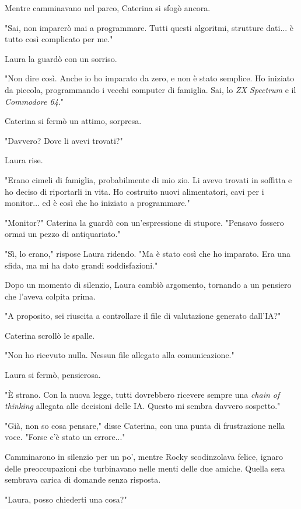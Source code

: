 Mentre camminavano nel parco, Caterina si sfogò ancora.

"Sai, non imparerò mai a programmare. Tutti questi algoritmi, strutture dati... è tutto così complicato per me."

Laura la guardò con un sorriso.

"Non dire così. Anche io ho imparato da zero, e non è stato semplice. Ho iniziato da piccola, programmando i vecchi computer di famiglia. Sai, lo \emph{ZX Spectrum} e il \emph{Commodore 64}."

Caterina si fermò un attimo, sorpresa.

"Davvero? Dove li avevi trovati?"

Laura rise.

"Erano cimeli di famiglia, probabilmente di mio zio. Li avevo trovati in soffitta e ho deciso di riportarli in vita. Ho costruito nuovi alimentatori, cavi per i monitor... ed è così che ho iniziato a programmare."

"Monitor?" Caterina la guardò con un'espressione di stupore. "Pensavo fossero ormai un pezzo di antiquariato."

"Sì, lo erano," rispose Laura ridendo. "Ma è stato così che ho imparato. Era una sfida, ma mi ha dato grandi soddisfazioni."

Dopo un momento di silenzio, Laura cambiò argomento, tornando a un pensiero che l'aveva colpita prima.

"A proposito, sei riuscita a controllare il file di valutazione generato dall'IA?"

Caterina scrollò le spalle.

"Non ho ricevuto nulla. Nessun file allegato alla comunicazione."

Laura si fermò, pensierosa.

"È strano. Con la nuova legge, tutti dovrebbero ricevere sempre una \emph{chain of thinking} allegata alle decisioni delle IA. Questo mi sembra davvero sospetto."

"Già, non so cosa pensare," disse Caterina, con una punta di frustrazione nella voce. "Forse c'è stato un errore..."

Camminarono in silenzio per un po', mentre Rocky scodinzolava felice, ignaro delle preoccupazioni che turbinavano nelle menti delle due amiche. Quella sera sembrava carica di domande senza risposta.


"Laura, posso chiederti una cosa?"

